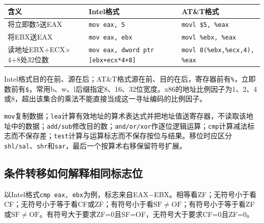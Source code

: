 \par\medskip\noindent\begin{minipage}{\linewidth}\fontsize{9.3}{12}\selectfont\begin{tabularx}{\linewidth}{@{}YYY@{}}
\toprule\noalign{}
\begin{minipage}[b]{\linewidth}\raggedright
含义
\end{minipage} & \begin{minipage}[b]{\linewidth}\raggedright
Intel格式
\end{minipage} & \begin{minipage}[b]{\linewidth}\raggedright
AT\&T格式
\end{minipage} \\
\midrule\noalign{}


将立即数5送EAX & \texttt{mov eax,\allowbreak{} 5} & \texttt{movl \$5,\allowbreak{} \%eax} \\
将EBX送EAX & \texttt{mov eax,\allowbreak{} ebx} & \texttt{movl \%ebx,\allowbreak{} \%eax} \\
读地址EBX+ECX\ensuremath{\times}4+8处32位数 & \texttt{mov eax,\allowbreak{} dword ptr [\allowbreak{}ebx+\allowbreak{}ecx*\allowbreak{}4+\allowbreak{}8]\allowbreak{}} & \texttt{movl 8(\allowbreak{}\%ebx,\allowbreak{}\%ecx,\allowbreak{}4)\allowbreak{},\allowbreak{} \%eax} \\
\bottomrule\end{tabularx}
\end{minipage}\par\medskip

Intel格式目的在前、源在后；AT\&T格式源在前、目的在后，寄存器前有\texttt{\%}，立即数前有\texttt{\$}，常用b、w、l后缀指定8、16、32位宽度。x86的地址比例因子为1、2、4或8，超出该集合的乘法不能直接当成这一寻址编码的比例因子。

\texttt{mov}复制数据；\texttt{lea}计算有效地址的算术表达式并把地址值送寄存器，不读取该地址中的数据；\texttt{add/\allowbreak{}sub}修改目的数；\texttt{and/\allowbreak{}or/\allowbreak{}xor}作逐位逻辑运算；\texttt{cmp}计算减法标志而不保存差；\texttt{test}计算与运算标志而不保存按位与结果。移位时应区分\texttt{shl/\allowbreak{}sal}、\texttt{shr}和\texttt{sar}，最后一个按算术右移保留符号扩展。

\subsection{条件转移如何解释相同标志位}\label{CO04-branch-flags}

以Intel格式\texttt{cmp eax,\allowbreak{} ebx}为例，标志来自EAX\ensuremath{-}EBX。相等看ZF；无符号小于看CF；无符号小于等于看CF或ZF；有符号小于看\(\mathrm{SF}\ne\mathrm{OF}\)；有符号小于等于看ZF或\(\mathrm{SF}\ne\mathrm{OF}\)。有符号大于要求ZF=0且SF=OF，无符号大于要求CF=0且ZF=0。

